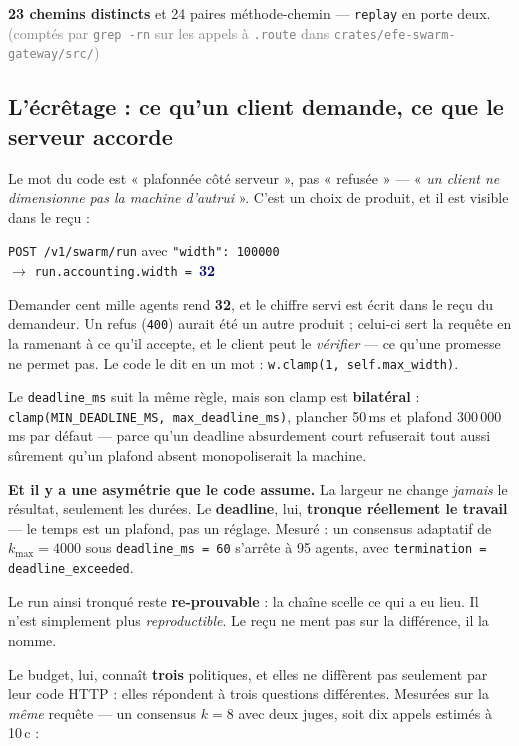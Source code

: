 \documentclass[10pt]{report}
\newcommand{\code}[1]{\texttt{\small #1}}
\newcommand{\mm}[1]{\textbf{\textcolor{navy}{#1}}}
\begin{document}
\textbf{23 chemins distincts} et 24 paires méthode-chemin --- \code{replay} en porte deux.
\footnotesize\textcolor{grey}{(comptés par \code{grep -rn} sur les appels à \code{.route} dans
\code{crates/efe-swarm-gateway/src/})}\normalsize

\subsection{L'écrêtage : ce qu'un client demande, ce que le serveur accorde}

Le mot du code est « plafonnée côté serveur », pas « refusée » --- « \emph{un client ne dimensionne
pas la machine d'autrui} ». C'est un choix de produit, et il est visible dans le reçu :

\begin{extrait}
\footnotesize
\code{POST /v1/swarm/run} avec \code{"width": 100000} \\
$\rightarrow$ \code{run.accounting.width = }\mm{32}
\end{extrait}

Demander cent mille agents rend \textbf{32}, et le chiffre servi est écrit dans le reçu du
demandeur. Un refus (\code{400}) aurait été un autre produit ; celui-ci sert la requête en la
ramenant à ce qu'il accepte, et le client peut le \emph{vérifier} --- ce qu'une promesse ne permet
pas. Le code le dit en un mot : \code{w.clamp(1, self.max\_width)}.

Le \code{deadline\_ms} suit la même règle, mais son clamp est \textbf{bilatéral} :
\code{clamp(MIN\_DEADLINE\_MS, max\_deadline\_ms)}, plancher 50\,ms et plafond 300\,000\,ms par
défaut --- parce qu'un deadline absurdement court refuserait tout aussi sûrement qu'un plafond absent
monopoliserait la machine.

\begin{alerte}
\textbf{Et il y a une asymétrie que le code assume.} La largeur ne change \emph{jamais} le résultat,
seulement les durées. Le \textbf{deadline}, lui, \textbf{tronque réellement le travail} --- le temps
est un plafond, pas un réglage. Mesuré : un consensus adaptatif de $k_{\max}=4000$ sous
\code{deadline\_ms = 60} s'arrête à 95 agents, avec \code{termination = deadline\_exceeded}.

Le run ainsi tronqué reste \textbf{re-prouvable} : la chaîne scelle ce qui a eu lieu. Il n'est
simplement plus \emph{reproductible}. Le reçu ne ment pas sur la différence, il la nomme.
\end{alerte}

Le budget, lui, connaît \textbf{trois} politiques, et elles ne diffèrent pas seulement par leur code
HTTP : elles répondent à trois questions différentes. Mesurées sur la \emph{même} requête --- un
consensus $k=8$ avec deux juges, soit dix appels estimés à 10\,c :
\end{document}

